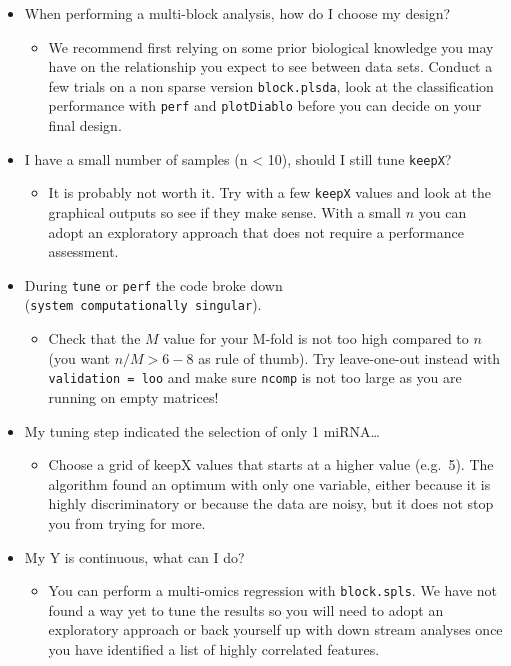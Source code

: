 \documentclass[]{book}
\providecommand{\tightlist}{%
  \setlength{\itemsep}{0pt}\setlength{\parskip}{0pt}}
\theoremstyle{definition}
\theoremstyle{definition}
\theoremstyle{definition}
\theoremstyle{remark}
\begin{document}
\begin{itemize}
\tightlist
\item
  When performing a multi-block analysis, how do I choose my design?

  \begin{itemize}
  \tightlist
  \item
    We recommend first relying on some prior biological knowledge you
    may have on the relationship you expect to see between data sets.
    Conduct a few trials on a non sparse version \texttt{block.plsda},
    look at the classification performance with \texttt{perf} and
    \texttt{plotDiablo} before you can decide on your final design.
  \end{itemize}
\item
  I have a small number of samples (n \textless{} 10), should I still
  tune \texttt{keepX}?

  \begin{itemize}
  \tightlist
  \item
    It is probably not worth it. Try with a few \texttt{keepX} values
    and look at the graphical outputs so see if they make sense. With a
    small \(n\) you can adopt an exploratory approach that does not
    require a performance assessment.
  \end{itemize}
\item
  During \texttt{tune} or \texttt{perf} the code broke down
  (\texttt{system\ computationally\ singular}).

  \begin{itemize}
  \tightlist
  \item
    Check that the \(M\) value for your M-fold is not too high compared
    to \(n\) (you want \(n/M > 6 - 8\) as rule of thumb). Try
    leave-one-out instead with
    \texttt{validation\ =\ \textquotesingle{}loo\textquotesingle{}} and
    make sure \texttt{ncomp} is not too large as you are running on
    empty matrices!
  \end{itemize}
\item
  My tuning step indicated the selection of only 1 miRNA\ldots{}

  \begin{itemize}
  \tightlist
  \item
    Choose a grid of keepX values that starts at a higher value
    (e.g.~5). The algorithm found an optimum with only one variable,
    either because it is highly discriminatory or because the data are
    noisy, but it does not stop you from trying for more.
  \end{itemize}
\item
  My Y is continuous, what can I do?

  \begin{itemize}
  \tightlist
  \item
    You can perform a multi-omics regression with \texttt{block.spls}.
    We have not found a way yet to tune the results so you will need to
    adopt an exploratory approach or back yourself up with down stream
    analyses once you have identified a list of highly correlated
    features.
  \end{itemize}
\end{itemize}
\end{document}
